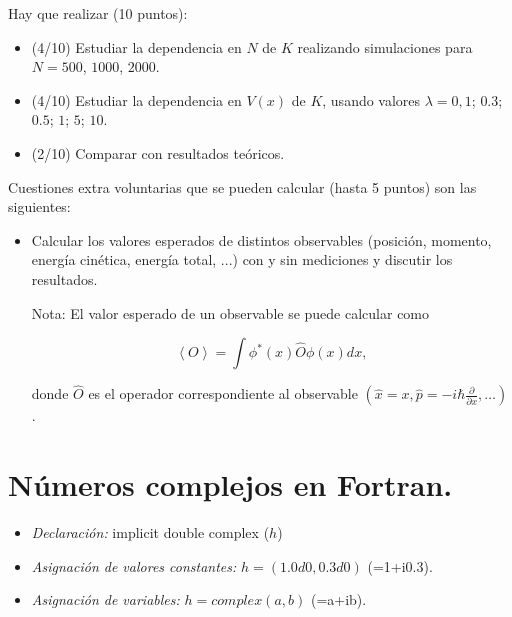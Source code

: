 \documentclass[12pt]{iopart}
\begin{document}
\begin{itemize}
Hay que realizar (10 puntos): 

\begin{itemize}
\item (4/10)  Estudiar la dependencia en $N$ de $K$ realizando simulaciones para $N=500$, $1000$, $2000$.
\item (4/10) Estudiar la dependencia en $V(x)$ de $K$, usando valores $\lambda=0, 1$; $0.3$; $0.5$; $1$; $5$; $10$.
\item (2/10) Comparar con resultados te\'oricos. 
\end{itemize}

Cuestiones extra voluntarias que se pueden calcular (hasta 5 puntos) son las siguientes:

\begin{itemize}
\item Calcular los valores esperados de distintos observables (posici\'on, momento, energ\'ia cin\'etica, energ\'ia total, ...) con y sin mediciones y discutir los resultados.

Nota: El valor esperado de un observable se puede calcular como 

$$\left< O \right >=\int  \phi^*(x) \hat{O}\phi(x) dx, $$ 

donde $\hat{O}$ es el operador correspondiente al observable $\left( \hat{x}=x, \hat{p}= -i\hbar \frac{\partial}{\partial x} , \dots  \right)$.  

\end{itemize}

\end{itemize}


\section*{N{\'u}meros complejos en Fortran.}

\begin{itemize}
\item{}{\it Declaraci{\'o}n:} implicit double complex ($h$)
\item{}{\it Asignaci{\'o}n de valores constantes:} $h=(1.0d0,0.3d0)$ (=1+i0.3).
\item{}{\it Asignaci{\'o}n de variables:} $h=complex(a,b)$ (=a+ib).
\end{itemize}
\end{document}
